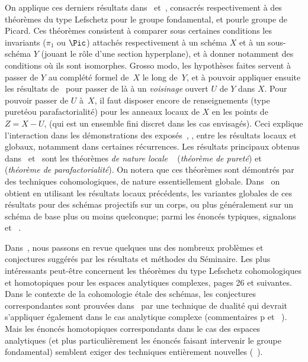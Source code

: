 On applique ces derniers r\'esultats dans~ et~, consacr\'es respectivement \`a des th\'eor\`emes du type Lefschetz pour le groupe fondamental, et pour\pageoriginale le groupe de \hbox{Picard}. Ces th\'eor\`emes consistent \`a comparer sous certaines conditions les invariants ($\pi_1$ ou $\Pic$) attach\'es respectivement \`a un sch\'ema $X$ et \`a un sous-sch\'ema $Y$ (jouant le r\^{o}le d'une section hyperplane), et \`a donner notamment des conditions o\`u ils sont isomorphes. Grosso modo, les hypoth\`eses faites servent \`a passer de $Y$ au compl\'et\'e formel de~$X$ le long de~$Y$, et \`a pouvoir appliquer ensuite les r\'esultats de~ pour passer de l\`a \`a un \emph{voisinage} ouvert $U$ de $Y$ dans $X$. Pour pouvoir passer de $U$ \`a~$X$, il faut disposer encore de renseignements (type \og puret\'e\fg ou \og parafactorialit\'e{\fg}) pour les anneaux locaux de $X$ en les points de $Z=X-U$, (qui est un ensemble fini discret dans les cas envisag\'es). Ceci explique l'interaction dans les d\'emonstrations des expos\'es~, ,  entre les r\'esultats locaux et globaux, notamment dans certaines r\'ecurrences. Les r\'esultats principaux obtenus dans~ et~ sont les th\'eor\`emes \emph{de nature locale} ~ (\emph{th\'eor\`eme de puret\'e}) et ~ (\emph{th\'eor\`eme de parafactorialit\'e}). On notera que ces th\'eor\`emes sont d\'emontr\'es par des techniques cohomologiques, de nature essentiellement globale. Dans~ on obtient en utilisant les r\'esultats locaux pr\'ec\'edents, les variantes globales de ces r\'esultats pour des sch\'emas projectifs sur un corps, ou plus g\'en\'eralement sur un sch\'ema de base plus ou moins quelconque; parmi les \'enonc\'es typiques, signalons ~ et ~.

Dans~, nous passons en revue quelques uns des nombreux probl\`emes et conjectures sugg\'er\'es par les r\'esultats et m\'ethodes du S\'eminaire. Les plus int\'eressants peut-\^etre concernent les th\'eor\`emes du type Lefschetz cohomologiques et homotopiques pour les espaces analytiques complexes, \cf {} pages 26 et suivantes. Dans le contexte de la cohomologie \'etale des sch\'emas\pageoriginale, les conjectures correspondantes sont prouv\'ees dans~ par une technique de dualit\'e qui devrait s'appliquer \'egalement dans le cas analytique complexe (\cf commentaires  p et ~). Mais les \'enonc\'es homotopiques correspondants dans le cas des espaces analytiques (et plus particuli\`erement les \'enonc\'es faisant intervenir le groupe fondamental) semblent exiger des techniques enti\`erement nouvelles (\cf {}~).

